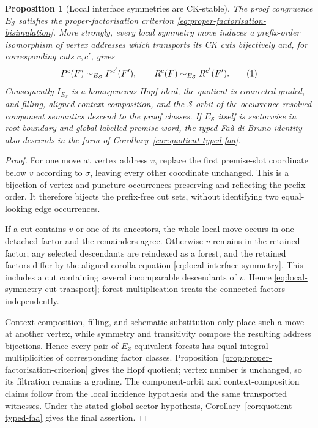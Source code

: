 \documentclass[10pt,a4paper]{article}
\theoremstyle{plain}
\newtheorem{proposition}[theorem]{Proposition}
\theoremstyle{definition}
\theoremstyle{remark}
\newcommand{\eqtag}{\refstepcounter{equation}\tag{\theequation}}
\begin{document}
\begin{proposition}[Local interface symmetries are CK-stable]
\label{prop:local-symmetry-ck-stable}
The proof congruence \(E_{\mathcal S}\) satisfies the proper-factorisation
criterion \eqref{eq:proper-factorisation-bisimulation}.  More strongly, every
local symmetry move induces a prefix-order isomorphism of vertex addresses
which transports its CK cuts bijectively and, for corresponding cuts \(c,c'\),
gives
\[
 P^c(F)\sim_{E_{\mathcal S}}P^{c'}(F'),
 \qquad
 R^c(F)\sim_{E_{\mathcal S}}R^{c'}(F').
\eqtag\label{eq:local-symmetry-cut-transport}
\]
Consequently \(I_{E_{\mathcal S}}\) is a homogeneous Hopf ideal, the quotient
is connected graded, and filling, aligned context composition, and the
\(\mathcal S\)-orbit of the occurrence-resolved component semantics descend
to the proof classes.  If \(E_{\mathcal S}\) itself is sectorwise in root
boundary and global labelled premise word, the typed Fa\`a di Bruno identity
also descends in the form of
Corollary~\ref{cor:quotient-typed-faa}.
\end{proposition}

\begin{proof}
For one move at vertex address \(v\), replace the first premise-slot coordinate
below \(v\) according to \(\sigma\), leaving every other coordinate unchanged.
This is a bijection of vertex and puncture occurrences preserving and
reflecting the prefix order.  It therefore bijects the prefix-free cut sets,
without identifying two equal-looking edge occurrences.

If a cut contains \(v\) or one of its ancestors, the whole local move occurs
in one detached factor and the remainders agree.  Otherwise \(v\) remains in
the retained factor; any selected descendants are reindexed as a forest, and
the retained factors differ by the aligned corolla equation
\eqref{eq:local-interface-symmetry}.  This includes a cut containing several
incomparable descendants of \(v\).  Hence
\eqref{eq:local-symmetry-cut-transport}; forest multiplication treats the
connected factors independently.

Context composition, filling, and schematic substitution only place such a
move at another vertex, while symmetry and transitivity compose the resulting
address bijections.  Hence every pair of \(E_{\mathcal S}\)-equivalent forests
has equal integral multiplicities of corresponding factor classes.
Proposition~\ref{prop:proper-factorisation-criterion} gives the Hopf quotient;
vertex number is unchanged, so its filtration remains a grading.  The
component-orbit and context-composition claims follow from the local incidence
hypothesis and the same transported witnesses.  Under the stated global
sector hypothesis, Corollary~\ref{cor:quotient-typed-faa} gives the final
assertion.
\end{proof}
\end{document}
